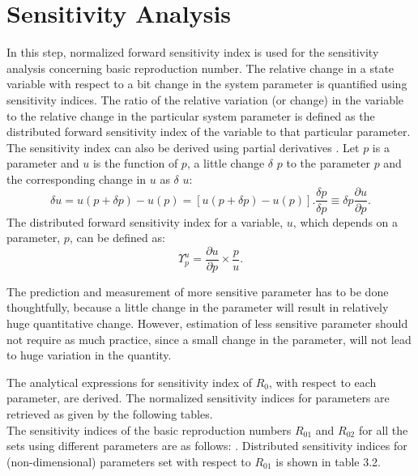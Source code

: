 \section{Sensitivity Analysis}
In this step, normalized forward sensitivity index is used for the sensitivity analysis concerning
basic reproduction number. The relative change in a state variable with respect to a
bit change in the system parameter is quantified using sensitivity indices. The ratio of the
relative variation (or change) in the variable to the relative change in the particular system
parameter is defined as the distributed forward sensitivity index of the variable to that particular parameter.
The sensitivity index can also be derived using partial derivatives \cite{edtr14}. Let $p$ is a
 parameter and $u$ is the function of $p$, a little change $\delta$ $p$ to the parameter $p$ and the corresponding change in $u$ as $\delta$ $u$:
\begin{equation} \delta u = u(p + \delta p) - u(p) =[ u(p + \delta p) - u(p)].\frac{\delta p}{\delta p} \equiv \delta p \frac{\partial u}{\partial p}. \end{equation}
The distributed forward sensitivity index for a variable, $u$, which depends on a parameter, $p$, can be defined as:
\begin{equation} \Upsilon_p^u =\frac{\partial u}{\partial p}\times \frac{p}{u} .\end{equation}
\par The prediction and measurement of more sensitive parameter has to be done thoughtfully, because a little change in the parameter will result in relatively huge quantitative change. However, estimation of less sensitive parameter should not require as much practice, since a small change in the parameter, will not lead to huge variation in the quantity.
\par The analytical expressions for sensitivity index of $R_{0}$, with respect to each parameter, are derived. The normalized sensitivity indices for parameters are retrieved as given by the following tables.\\
The sensitivity indices of the basic reproduction numbers $R_{01}$ and $R_{02}$ for all the sets using different parameters are as follows:
. Distributed sensitivity indices for (non-dimensional) parameters set with respect to $R_{01}$ is shown in table 3.2.
